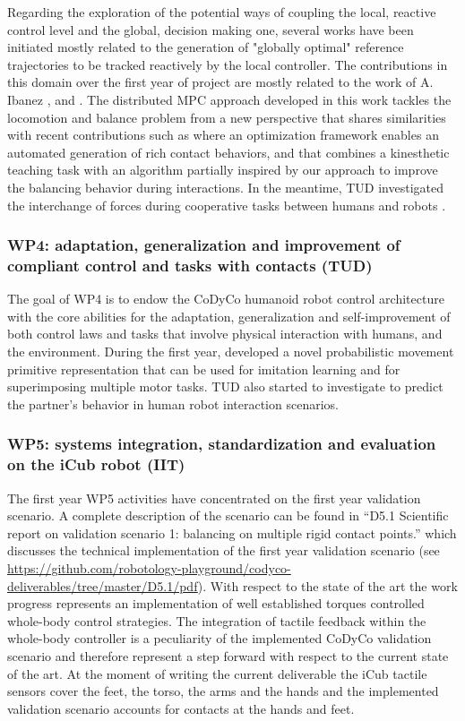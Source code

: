 \documentclass[12pt,a4paper,twoside]{article}
\begin{document}
Regarding the exploration of the potential ways of coupling the local, reactive control level and the global, decision making one, several works have been initiated mostly related to the generation of "globally optimal" reference trajectories to be tracked reactively by the local controller. The contributions in this domain over the first year of project are mostly related to the work of A. Ibanez \cite{ibanez2013}, \cite{ibanez2014-icra} and \cite{ibanez2014-ark}. The distributed MPC approach developed in this work tackles the locomotion and balance problem from a new perspective that shares similarities with recent contributions such as \cite{mordatch2012} where an optimization framework enables an automated generation of rich contact behaviors, and \cite{ott2013} that combines a kinesthetic teaching task with an algorithm partially inspired by our approach to improve the balancing behavior during interactions. In the meantime, TUD investigated the interchange of forces during cooperative tasks between humans and robots \cite{berger2013}.

\subsubsection{WP4: adaptation, generalization and improvement of compliant control and tasks with contacts (TUD)}

The goal of WP4 is to endow the CoDyCo
humanoid robot control architecture with the
core abilities for the adaptation, generalization
and self-improvement of both control laws and
tasks that involve physical interaction with
humans, and the environment.
During the first year, developed a novel 
probabilistic movement primitive representation that
can be used for imitation learning and for superimposing multiple motor tasks. 
TUD also started to investigate to predict the partner's behavior in 
human robot interaction scenarios. 

\subsubsection{WP5: systems integration, standardization and evaluation on the iCub robot (IIT)}

The first year WP5 activities have concentrated on the first year validation scenario. A complete description of the scenario can be found in ``D5.1 Scientific report on validation scenario 1: balancing on multiple rigid contact points.'' which discusses the technical implementation of the first year validation scenario (see \url{https://github.com/robotology-playground/codyco-deliverables/tree/master/D5.1/pdf}). With respect to the state of the art the work progress represents an implementation of well established torques controlled whole-body control strategies. The integration of tactile feedback within the whole-body controller is a peculiarity of the implemented CoDyCo validation scenario and therefore represent a step forward with respect to the current state of the art. At the moment of writing the current deliverable the iCub tactile sensors cover the feet, the torso, the arms and the hands and the implemented validation scenario accounts for contacts at the hands and feet.
\end{document}
